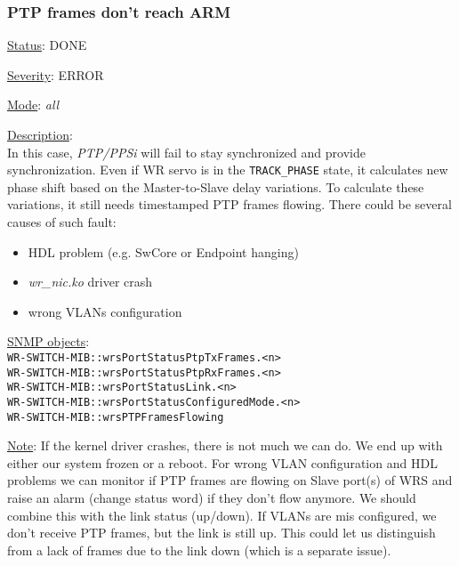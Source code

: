 \subsubsection{\bf PTP frames don't reach ARM}
		\label{fail:timing:no_frames}
		\begin{packed_enum}
			\item [] \underline{Status}: DONE
			\item [] \underline{Severity}: ERROR
			\item [] \underline{Mode}: \emph{all}
			\item [] \underline{Description}:\\
				In this case, \emph{PTP/PPSi} will fail to stay synchronized and provide
				synchronization. Even if WR servo is in the \texttt{TRACK\_PHASE} state,
				it calculates new phase shift based on the Master-to-Slave delay
				variations. To calculate these variations, it still needs timestamped
				PTP frames flowing. There could be several causes of such fault:
				\begin{itemize}
					\item HDL problem (e.g. SwCore or Endpoint hanging)
					\item \emph{wr\_nic.ko} driver crash
					\item wrong VLANs configuration
				\end{itemize}
			\item [] \underline{SNMP objects}:\\
				\texttt{WR-SWITCH-MIB::wrsPortStatusPtpTxFrames.<n>}\\
				\texttt{WR-SWITCH-MIB::wrsPortStatusPtpRxFrames.<n>}\\
				\texttt{WR-SWITCH-MIB::wrsPortStatusLink.<n>}\\
				\texttt{WR-SWITCH-MIB::wrsPortStatusConfiguredMode.<n>}\\
				\texttt{WR-SWITCH-MIB::wrsPTPFramesFlowing}
			\item [] \underline{Note}: If the kernel driver crashes, there is not much
				we can do. We end up with either our system frozen or a reboot. For
				wrong VLAN configuration and HDL problems we can monitor if PTP frames
				are flowing on Slave port(s) of WRS and raise an alarm (change status
				word) if they don't flow anymore. We should combine this with the link
				status (up/down). If VLANs are mis configured, we don't receive PTP
				frames, but the link is still up. This could let us distinguish from a
				lack of frames due to the link down (which is a separate issue).
		\end{packed_enum}

